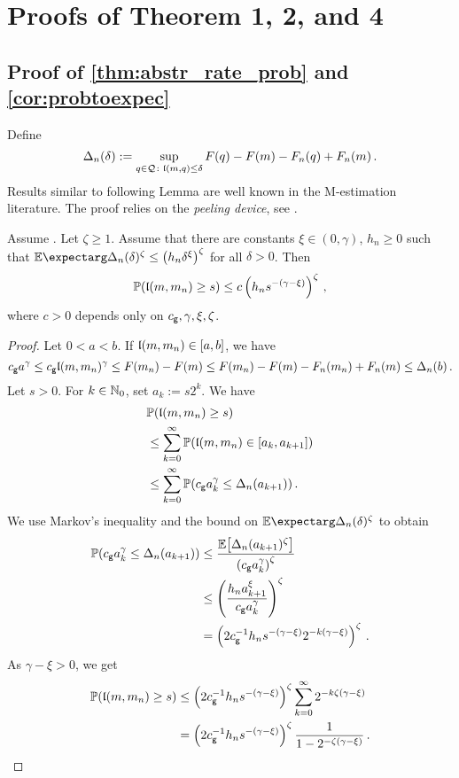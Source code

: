 %
%
\section{Proofs of Theorem 1, 2, and 4}\label{app:proofs:1and2}
%
%
%
%
\subsection{Proof of \autoref{thm:abstr_rate_prob} and \autoref{cor:probtoexpec}}
%
%
%
Define
\begin{equation*}
	\Delta_n(\delta) := \sup_{q\in\mathcal{Q}\colon \mathfrak{l}(m,q)\leq \delta} F(q)-F(m)-F_n(q)+F_n(m)
	\, .
\end{equation*}
%
Results similar to following Lemma are well known in the M-estimation literature. The proof relies on the \textit{peeling device}, see \cite{geer00}.
%
\begin{lemma}\label{lmm:weak:argmin}	
	Assume . Let $\zeta \geq 1$. Assume that there are constants $\xi\in(0,\gamma)$, $h_n\geq 0$ such that
	$\Ex{\Delta_n(\delta)^\zeta} \leq \br{h_n \delta^\xi}^\zeta$	for all $\delta>0$. Then
	\begin{equation*}
		\mathbb{P}\mathopen{}\left( \mathfrak{l}(m,m_n) \geq s \right)\mathclose{}
		\leq
		c \left( h_n s^{-(\gamma-\xi)} \right)^\zeta
		\, ,
	\end{equation*}
	where $c > 0$ depends only on $c_{\mathsf{g}}, \gamma, \xi, \zeta$.
\end{lemma}
%
\begin{proof}
	Let $0 < a < b$.
	If $\mathfrak{l}(m, m_n) \in [a,b]$, we have
	\begin{equation*}
		c_{\mathsf{g}} a^\gamma 
		\leq 
		c_{\mathsf{g}} \mathfrak{l}(m,m_n)^\gamma
		\leq 
		F(m_n)-F(m)
		\leq 
		F(m_n)-F(m)-F_n(m_n)+F_n(m)
		\leq 
		\Delta_n(b)
		\, .
	\end{equation*}
	Let $s>0$. 
	For $k\in \mathbb{N}_0$, set $a_k := s 2^{k}$. We have
	\begin{align*}
		&\mathbb{P}\mathopen{}\left( \mathfrak{l}(m,m_n) \geq s \right)\mathclose{}
		\\&\leq 
		\sum_{k=0}^{\infty}\mathbb{P}\mathopen{}\left( \mathfrak{l}(m, m_n) \in [a_k, a_{k+1}] \right)\mathclose{}
		\\&\leq 
		\sum_{k=0}^{\infty} \mathbb{P}\mathopen{}\left( c_{\mathsf{g}} a_k^\gamma \leq \Delta_n(a_{k+1}) \right)\mathclose{}
		\, .
	\end{align*}
	We use Markov's inequality and the bound on $\Ex{\Delta_n(\delta)^\zeta}$ to obtain
	\begin{align*}
		\mathbb{P}\mathopen{}\left( c_{\mathsf{g}} a_k^\gamma \leq \Delta_n(a_{k+1}) \right)\mathclose{}
		&\leq
		\frac{\mathbb{E}\!\left[  \Delta_n(a_{k+1})^\zeta \right]}{\left( c_{\mathsf{g}} a_k^\gamma \right)^\zeta} 
		\\&\leq
		\left( \frac{h_n a_{k+1}^\xi}{c_{\mathsf{g}} a_k^\gamma} \right)^\zeta
		\\&=
		\left( 2 c_{\mathsf{g}}^{-1} h_n s^{-(\gamma-\xi)} 2^{-k(\gamma-\xi)} \right)^\zeta
		\, .
	\end{align*}
	As $\gamma-\xi>0$, we get 
	\begin{align*}
		\mathbb{P}\mathopen{}\left( \mathfrak{l}(m,m_n) \geq s \right)\mathclose{}
		&\leq
		\left( 2 c_{\mathsf{g}}^{-1} h_n s^{-(\gamma-\xi)} \right)^\zeta \sum_{k=0}^\infty 2^{-k\zeta(\gamma-\xi)}
		\\&=
		\left( 2 c_{\mathsf{g}}^{-1} h_n s^{-(\gamma-\xi)} \right)^\zeta \frac{1}{1-2^{-\zeta(\gamma-\xi)}}
		\, .
	\end{align*}
\end{proof}
